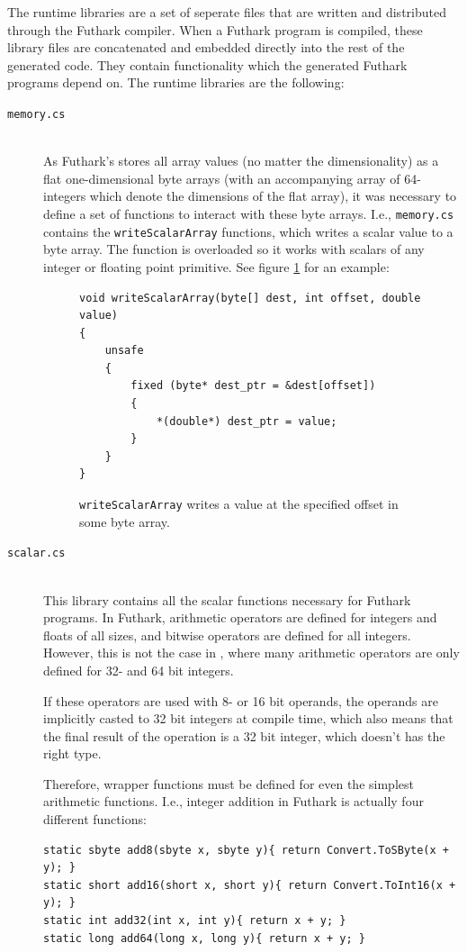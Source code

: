 The runtime libraries are a set of seperate \csharp{} files that are written and
distributed through the Futhark compiler. When a Futhark program is compiled,
these library files are concatenated and embedded directly into the rest of the
generated code. They contain functionality which the generated Futhark programs
depend on.
The runtime libraries are the following:
\begin{description}
\item[\texttt{memory.cs}] \hfill\\
  As Futhark's stores all array values (no matter the dimensionality) as a flat one-dimensional byte arrays (with an accompanying
  array of 64-integers which denote the dimensions of the flat array), it was
  necessary to define a set of functions to interact with these byte arrays.
  I.e., \texttt{memory.cs} contains the \texttt{writeScalarArray} functions,
  which writes a scalar value to a byte array. The function is overloaded so it
  works with scalars of any integer or floating point primitive. See figure
  \ref{fig:writeScalarArray} for an example:

\begin{figure}[h]
\centering
\begin{verbatim}
void writeScalarArray(byte[] dest, int offset, double value)
{
    unsafe
    {
        fixed (byte* dest_ptr = &dest[offset])
        {
            *(double*) dest_ptr = value;
        }
    }
}
\end{verbatim}
\caption{\texttt{writeScalarArray} writes a value at the specified offset in
some byte array.}
\label{fig:writeScalarArray}
\end{figure}

\item[\texttt{scalar.cs}] \hfill\\
  This library contains all the scalar functions necessary for Futhark \csharp{}
  programs.
  In Futhark, arithmetic operators are defined for integers and floats of all
  sizes, and bitwise operators are defined for all integers.
  However, this is not the case in \csharp{}, where many arithmetic operators
  are only defined for 32- and 64 bit integers.
  
  If these operators are used with 8- or 16 bit operands, the operands are
  implicitly casted to 32 bit integers at compile time, which also means that
  the final result of the operation is a 32 bit integer, which doesn't has the
  right type.

  Therefore, wrapper functions must be defined for even the simplest arithmetic
  functions. I.e., integer addition in \csharp{} Futhark is actually four different
  functions:
\begin{verbatim}
static sbyte add8(sbyte x, sbyte y){ return Convert.ToSByte(x + y); }
static short add16(short x, short y){ return Convert.ToInt16(x + y); }
static int add32(int x, int y){ return x + y; }
static long add64(long x, long y){ return x + y; }
\end{verbatim}


\end{description}
